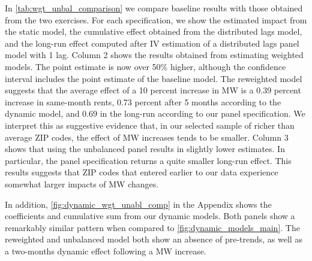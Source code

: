 In \autoref{tab:wgt_unbal_comparison} we compare baseline results with those obtained from the 
two exercises. For each specification, we show the estimated impact from the static model, the 
cumulative effect obtained from the distributed lags model, and the long-run effect computed 
after IV estimation of a distributed lags panel model with 1 lag. Column 2 shows the results 
obtained from estimating weighted models. The point estimate is now over 50\% higher, although 
the confidence interval includes the point estimate of the baseline model. The reweighted model 
suggests that the average effect of a 10 percent increase in MW is a 0.39 percent increase in 
same-month rents, 0.73 percent after 5 months according to the dynamic model, and 0.69 in the 
long-run according to our panel specification. 
We interpret this as suggestive evidence that, in our selected sample 
of richer than average ZIP codes, the effect of MW increases tends to be smaller. Column 3 shows 
that using the unbalanced panel results in slightly lower estimates. In particular, the panel 
specification returns a quite smaller long-run effect. This results suggests that ZIP codes 
that entered earlier to our data experience somewhat larger impacts of MW changes.

In addition, \autoref{fig:dynamic_wgt_unabl_comp} in the Appendix shows the coefficients and 
cumulative sum from our dynamic models. Both panels show a remarkably similar pattern when 
compared to \autoref{fig:dynamic_models_main}. The reweighted and unbalanced model both show an 
absence of pre-trends, as well as a two-months dynamic effect following a MW increase.


